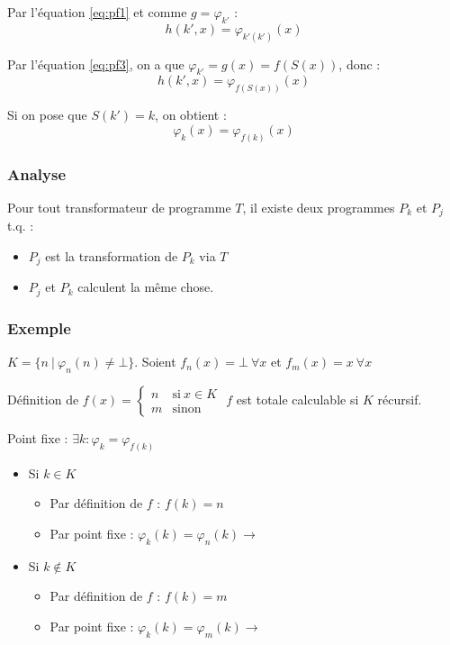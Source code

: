 Par l'équation \ref{eq:pf1} et comme $g = \varphi_{k'}$ :
\begin{equation*}
h(k',x) = \varphi_{k'(k')}(x)
\end{equation*}

Par l'équation \ref{eq:pf3}, on a que $\varphi_{k'} = g(x) = f(S(x))$, donc :
\begin{equation*}
h(k',x) = \varphi_{f(S(x))}(x)
\end{equation*}

Si on pose que $S(k') = k$, on obtient :
\begin{equation*}
\varphi_k(x) = \varphi_{f(k)}(x)
\end{equation*}

\subsubsection{Analyse}

Pour tout transformateur de programme $T$, il existe deux programmes $P_k$ et $P_j$ t.q. :
\begin{itemize}
\item $P_j$ est la transformation de $P_k$ via $T$
\item $P_j$ et $P_k$ calculent la même chose.
\end{itemize}

\subsubsection{Exemple}

$K = \{n\ |\ \varphi_n(n) \neq \bot \}$. Soient $f_n(x) = \bot\ \forall x$ et $f_m(x) = x\ \forall x$

Définition de $f(x) =
\begin{cases}
	n & \text{si}\ x \in K\\
	m & \text{sinon}
\end{cases}$ $f$ est totale calculable si $K$ récursif.

Point fixe : $\exists k : \varphi_k = \varphi_{f(k)}$
\begin{itemize}
\item Si $k \in K$
	\begin{itemize}
	\item Par définition de $f$ : $f(k) = n$
	\item Par point fixe : $\varphi_k (k) = \varphi_n(k) \rightarrow$ 
	\end{itemize}
\item Si $k \notin K$
	\begin{itemize}
	\item Par définition de $f$ : $f(k) = m$
	\item Par point fixe : $\varphi_k(k) = \varphi_m(k) \rightarrow$ 
	\end{itemize}
\end{itemize}


